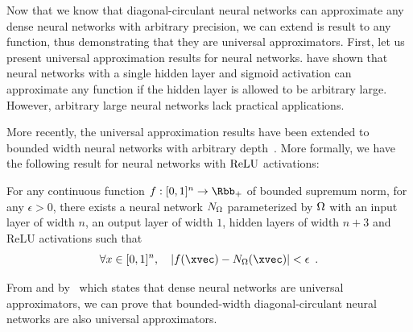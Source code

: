 


Now that we know that diagonal-circulant neural networks can approximate any dense neural networks with arbitrary precision, we can extend is result to any function, thus demonstrating that they are universal approximators.
First, let us present universal approximation results for neural networks.
\citet{cybenko1989approximation,hornik1989multilayer} have shown that neural networks with a single hidden layer and sigmoid activation can approximate any function if the hidden layer is allowed to be arbitrary large. 
However, arbitrary large neural networks lack practical applications.

More recently, the universal approximation results have been extended to bounded width neural networks with arbitrary depth~\cite{lu2017expressive,hanin2017universal}.
More formally, we have the following result for neural networks with $\mathrm{ReLU}$ activations:


\begin{theorem}
  \label{theorem:ch3-universal_approximation_theorem_for_neural_network}
  For any continuous function $f:[0,1]^{n} \rightarrow \Rbb_+$ of bounded supremum norm, for any $\epsilon>0$, there exists a neural network $N_\Omega$ parameterized by $\Omega$ with an input layer of width $n$, an output layer of width $1$, hidden layers of width $n+3$ and ReLU activations such that 
  \begin{equation}
    \forall x \in [0,1]^n, \quad \left| f(\xvec) - \nn_\weights(\xvec) \right| < \epsilon \enspace.
  \end{equation}
  \removespace
\end{theorem}

From  and  by~\citet{hanin2017universal} which states that dense neural networks are universal approximators, we can prove that bounded-width diagonal-circulant neural networks are also universal approximators.


